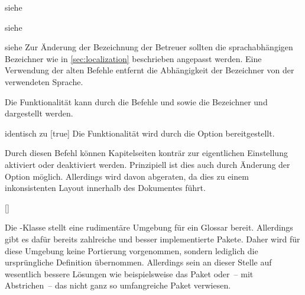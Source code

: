 \begin{Declaration*}{}
\begin{Declaration}{}{%
  siehe %
}
\begin{Declaration}{}{%
  siehe %
}
\begin{Declaration}{}{%
  siehe %
}
\printdeclarationlist%
%
Zur Änderung der Bezeichnung der Betreuer sollten die sprachabhängigen 
Bezeichner wie in \autoref{sec:localization} beschrieben angepasst werden. Eine 
Verwendung der alten Befehle entfernt die Abhängigkeit der Bezeichner von der 
verwendeten Sprache.
\end{Declaration}
\end{Declaration}
\end{Declaration}

\begin{Declaration}{}
\printdeclarationlist%
%
Die Funktionalität kann durch die Befehle  und 
 sowie die Bezeichner  und 
 dargestellt werden.
\end{Declaration}

\begin{Declaration}{}{%
  identisch zu [true]%
}
\printdeclarationlist%
%
Die Funktionalität wird durch die Option  bereitgestellt.
\end{Declaration}

\begin{Declaration}{}
\printdeclarationlist%
%
Durch diesen Befehl können Kapitelseiten konträr zur eigentlichen Einstellung 
aktiviert oder deaktiviert werden. Prinzipiell ist dies auch durch Änderung der 
Option  möglich. Allerdings wird davon abgeraten, da dies 
zu einem inkonsistenten Layout innerhalb des Dokumentes führt.
\end{Declaration}

\begin{Declaration}{[]}
\begin{Declaration}{}
\printdeclarationlist%
%
Die -Klasse stellt eine rudimentäre Umgebung für ein Glossar 
bereit. Allerdings gibt es dafür bereits zahlreiche und besser implementierte 
Pakete. Daher wird für diese Umgebung keine Portierung vorgenommen, sondern 
lediglich die ursprüngliche Definition übernommen. Allerdings sein an dieser 
Stelle auf wesentlich bessere Lösungen wie beispielsweise das Paket 
 oder~-- mit Abstrichen~-- das nicht ganz so umfangreiche 
Paket  verwiesen. 
\end{Declaration}
\end{Declaration}
\end{Declaration*}




